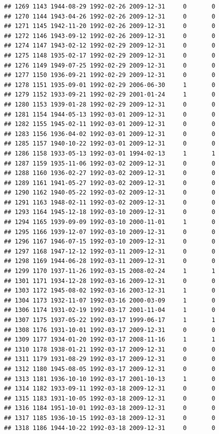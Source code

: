 \documentclass[
]{book}
\begin{document}
\begin{verbatim}
## 1269 1143 1944-08-29 1992-02-26 2009-12-31     0       0
## 1270 1144 1943-04-26 1992-02-26 2009-12-31     0       0
## 1271 1145 1942-11-20 1992-02-26 2009-12-31     0       0
## 1272 1146 1943-09-12 1992-02-26 2009-12-31     0       0
## 1274 1147 1943-02-12 1992-02-29 2009-12-31     0       0
## 1275 1148 1935-02-17 1992-02-29 2009-12-31     0       0
## 1276 1149 1949-07-25 1992-02-29 2009-12-31     0       0
## 1277 1150 1936-09-21 1992-02-29 2009-12-31     0       0
## 1278 1151 1935-09-01 1992-02-29 2006-06-30     1       0
## 1279 1152 1933-09-21 1992-02-29 2001-01-24     1       0
## 1280 1153 1939-01-28 1992-02-29 2009-12-31     0       0
## 1281 1154 1944-05-13 1992-03-01 2009-12-31     0       0
## 1282 1155 1945-02-11 1992-03-01 2009-12-31     0       0
## 1283 1156 1936-04-02 1992-03-01 2009-12-31     0       0
## 1285 1157 1940-10-22 1992-03-01 2009-12-31     0       0
## 1286 1158 1933-05-13 1992-03-01 1994-02-13     1       1
## 1287 1159 1935-11-06 1992-03-02 2009-12-31     0       0
## 1288 1160 1936-02-27 1992-03-02 2009-12-31     0       0
## 1289 1161 1941-05-27 1992-03-02 2009-12-31     0       0
## 1290 1162 1940-05-22 1992-03-02 2009-12-31     0       0
## 1291 1163 1948-02-11 1992-03-02 2009-12-31     0       0
## 1293 1164 1945-12-18 1992-03-10 2009-12-31     0       0
## 1294 1165 1939-09-09 1992-03-10 2000-11-01     1       0
## 1295 1166 1939-12-07 1992-03-10 2009-12-31     0       0
## 1296 1167 1946-07-15 1992-03-10 2009-12-31     0       0
## 1297 1168 1947-12-12 1992-03-11 2009-12-31     0       0
## 1298 1169 1944-06-28 1992-03-11 2009-12-31     0       0
## 1299 1170 1937-11-26 1992-03-15 2008-02-24     1       1
## 1301 1171 1934-12-28 1992-03-16 2009-12-31     0       0
## 1303 1172 1945-08-02 1992-03-16 2003-12-31     1       0
## 1304 1173 1932-11-07 1992-03-16 2000-03-09     1       0
## 1306 1174 1931-02-19 1992-03-17 2001-11-04     1       0
## 1307 1175 1937-05-22 1992-03-17 1999-06-17     1       1
## 1308 1176 1931-10-01 1992-03-17 2009-12-31     0       0
## 1309 1177 1934-01-20 1992-03-17 2008-11-16     1       1
## 1310 1178 1938-01-21 1992-03-17 2009-12-31     0       0
## 1311 1179 1931-08-29 1992-03-17 2009-12-31     0       0
## 1312 1180 1945-08-05 1992-03-17 2009-12-31     0       0
## 1313 1181 1936-10-10 1992-03-17 2001-10-13     1       0
## 1314 1182 1933-09-11 1992-03-18 2009-12-31     0       0
## 1315 1183 1931-10-05 1992-03-18 2009-12-31     0       0
## 1316 1184 1951-10-01 1992-03-18 2009-12-31     0       0
## 1317 1185 1936-10-15 1992-03-18 2009-12-31     0       0
## 1318 1186 1944-10-22 1992-03-18 2009-12-31     0       0

\end{verbatim}
\end{document}
